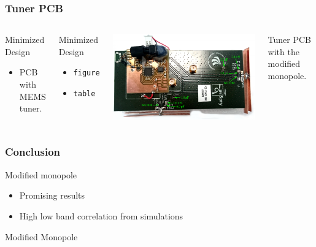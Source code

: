 \begin{frame}[fragile]
    \frametitle{Tuner PCB}
    \begin{columns}[onlytextwidth,t]
        \begin{block}{Minimized Design}
          \begin{itemize}
          \item PCB with MEMS tuner.
          \end{itemize}
        \end{block}
        \begin{block}{Minimized Design}
            \begin{itemize}
                \item \texttt{figure}
                \item \texttt{table}
            \end{itemize}
        \end{block}

        \begin{center}
            \includegraphics[scale=0.33]{img/Lasse/lassedouble.pdf}
        \end{center}
        Tuner PCB with the modified monopole.
    \end{columns}
\end{frame}

\begin{frame}
  \frametitle{Conclusion}
    \begin{block}{Modified monopole}
      \begin{itemize}
    \item Promising results
    \item High low band correlation from simulations 
      \end{itemize}
    \end{block}
    \begin{block}{Modified Monopole}
        
    \end{block}
\end{frame}

